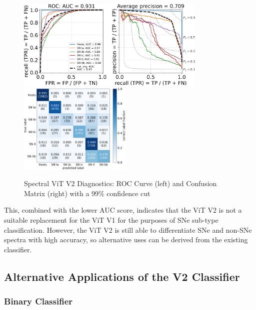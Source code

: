 \begin{figure}[b!]
    \centering
    \includegraphics[height=4.3cm]{figures/v2_real/vit_model_V2roc99_e26.png}
    \quad
    \includegraphics[height=4.3cm]{figures/v2_real/vit_model_V2cm99_e26.png}
    \caption[Spectral ViT V2 Diagnostics: 99\% Cut]{Spectral ViT V2 Diagnostics: ROC Curve (left) and Confusion Matrix (right) with a 99\% confidence
    cut\label{fig:v2_99_qual}}
\end{figure}

This, combined with the lower AUC score, indicates that the ViT V2 is not a suitable 
replacement for the ViT V1 for the purposes of SNe sub-type classification. However, the ViT V2
is still able to differentiate SNe and non-SNe spectra with high accuracy, so alternative uses 
can be derived from the existing classifier. 

\subsection{Alternative Applications of the V2 Classifier}

\subsubsection{Binary Classifier}

